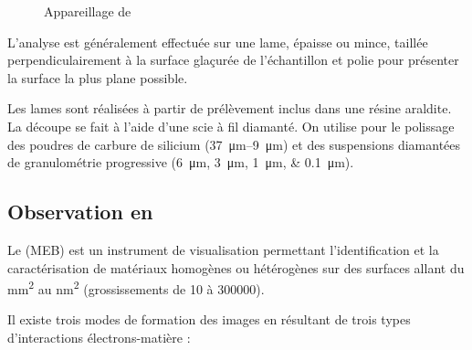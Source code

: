 \begin{figure}
  \caption{Appareillage de \CL}
  \label{fig:CL_app}
\end{figure}

L'analyse est généralement effectuée sur une lame, épaisse ou mince, 
taillée perpendiculairement à la surface glaçurée de l'échantillon 
et polie pour présenter la surface la plus plane possible.

Les lames sont réalisées à partir de prélèvement inclus dans une 
résine araldite. La découpe se fait à l'aide d'une scie à fil 
diamanté. On utilise pour le polissage des poudres de carbure 
de silicium (\SIrange[range-phrase=\ et\ ]{37}{9}{\um}) et des
suspensions diamantées de granulométrie progressive 
(\SIlist{6;3;1;0.1}{\um}).

\subsection{Observation en \MEB[ie]}
Le \MEB (MEB) est un instrument de visualisation permettant 
l'identification et la caractérisation de matériaux homogènes 
ou hétérogènes sur des surfaces allant du \si{\mm\squared} au
\si{\nm\squared} (grossissements de \texttimes\num{10} à 
\texttimes\num{300000}).

Il existe trois modes de formation des images en \MEB[ie] résultant 
de trois types d'interactions électrons-matière :

